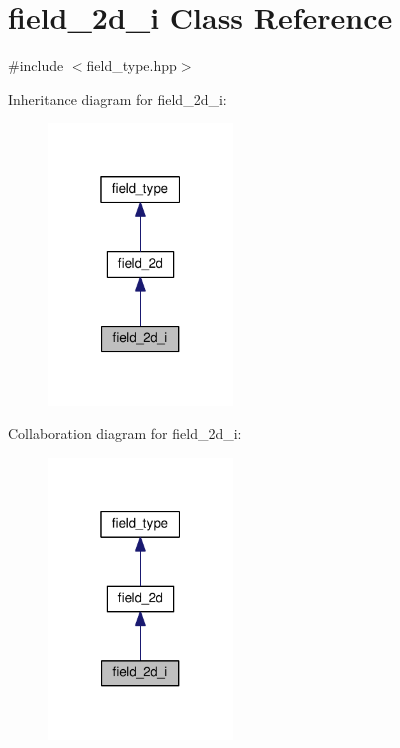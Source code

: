 \hypertarget{classfield__2d__i}{}\section{field\+\_\+2d\+\_\+i Class Reference}
\label{classfield__2d__i}


{\ttfamily \#include $<$field\+\_\+type.\+hpp$>$}



Inheritance diagram for field\+\_\+2d\+\_\+i\+:\nopagebreak
\begin{figure}[H]
\begin{center}
\leavevmode
\includegraphics[width=139pt]{dd/d3f/classfield__2d__i__inherit__graph}
\end{center}
\end{figure}


Collaboration diagram for field\+\_\+2d\+\_\+i\+:\nopagebreak
\begin{figure}[H]
\begin{center}
\leavevmode
\includegraphics[width=139pt]{d4/d8c/classfield__2d__i__coll__graph}
\end{center}
\end{figure}
